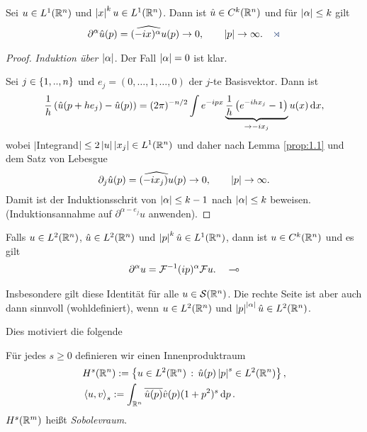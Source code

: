 \begin{cor}
\label{prop:1.2}
Sei $u\in L^1(\mathbb{R}^n)$ und $\left|x\right|^ku\in L^1(\mathbb{R}^n)$. Dann ist $\hat{u}\in
C^k(\mathbb{R}^n)$ und für $\left|\alpha\right|\le k$ gilt
\begin{align*}
\partial^\alpha \hat{u}(p) = \widehat{(-ix)^\alpha u}(p) \to 0,\qquad
\abs{p}\to \infty.\fishhere
\end{align*}
\end{cor}
\begin{proof}
\textit{Induktion über $\left|\alpha\right|$}. Der Fall $\left|\alpha\right|=0$ ist klar.

Sei $j\in\left\{ 1,..,n \right\}$ und $e_j = (0,\ldots,1,\ldots,0)$ der $j$-te
Basisvektor. Dann ist
\begin{align*}
\frac{1}{h}\left(\hat{u}(p+he_j) - \hat{u}(p) \right)
= (2\pi)^{-n/2}\int e^{-ipx}\underbrace{\frac{1}{h}\left(e^{-ihx_j}-1
\right)}_{\to -ix_j}u(x)\,\mathrm{d} x,
\end{align*}
wobei $|$Integrand$| \le 2\left|u\right|\left|x_j\right|\in L^1(\mathbb{R}^n)$ und daher nach Lemma
\ref{prop:1.1} und dem Satz von Lebesgue
\begin{align*}
\partial_j \hat{u}(p) = \widehat{(-ix_j)u}(p) \to 0,\qquad \left|p\right|\to\infty.
\end{align*}
Damit ist der Induktionsschrit von $\left|\alpha\right| \le k-1$ nach $\left|\alpha\right|
\le k$ beweisen. (Induktionsannahme auf $\partial^{\alpha-e_j} u$
anwenden).\qedhere
\end{proof}

\begin{bem*}[Folgerung.]
Falls $u\in L^2(\mathbb{R}^n)$, $\hat{u}\in L^2(\mathbb{R}^n)$ und $\left|p\right|^k\hat{u}\in
L^1(\mathbb{R}^n)$, dann ist $u\in C^k(\mathbb{R}^n)$ und es gilt
\begin{align*}
\partial^\alpha u = \mathcal{F}^{-1}(ip)^\alpha \mathcal{F} u.\quad\multimap
\end{align*}
\end{bem*}

\begin{bem*}
Insbesondere gilt diese Identität für alle $u\in\mathcal{S}(\mathbb{R}^n)$. Die rechte Seite
ist aber auch dann sinnvoll (wohldefiniert), wenn $u\in L^2(\mathbb{R}^n)$ und
$\left|p\right|^{\left|\alpha\right|}\hat{u}\in L^2(\mathbb{R}^n)$.\maphere
\end{bem*}

Dies motiviert die folgende

\begin{defn*}
Für jedes $s\ge 0$ definieren wir einen Innenproduktraum
\begin{align*}
&H^s(\mathbb{R}^n) := \left\{ u\in L^2(\mathbb{R}^n)\,:\,\hat{u}(p)\left|p\right|^s \in L^2(\mathbb{R}^n)\right\},\\
&\left\langle u,v\right\rangle_s := \int_{\mathbb{R}^n}
\overline{\hat{u}(p)}\hat{v}(p)(1+p^2)^s\,\mathrm{d} p\,.
\end{align*}
$H^s(\mathbb{R}^m)$ heißt \emph{Sobolevraum}.\fishhere
\end{defn*}


